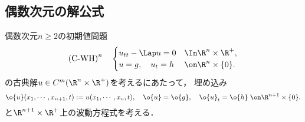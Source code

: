 \documentclass[uplatex,dvipdfmx]{jsreport}
\begin{document}
\subsection{偶数次元の解公式}

\begin{problem}
    偶数次元$n\ge2$の初期値問題
    \[\text{(C-WH)}^{n}\quad\begin{cases}
        u_{tt}-\Lap u=0&\In\R^n\times\R^+,\\
        u=g,\quad u_t=h&\on\R^n\times\{0\}.
    \end{cases}\]
    の古典解$u\in C^m(\R^n\times\R^+)$を考えるにあたって，
    埋め込み
    \[\o{u}(x_1,\cdots,x_{n+1},t):=u(x_1,\cdots,x_n,t),\quad \o{u}=\o{g},\quad\o{u}_t=\o{h}\;\on\R^{n+1}\times\{0\}.\]
    と$\R^{n+1}\times\R^+$上の波動方程式を考える．
\end{problem}
\end{document}
